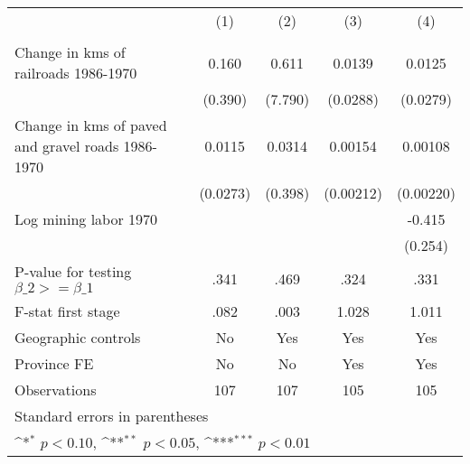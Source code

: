 {
\def\sym#1{\ifmmode^{#1}\else\(^{#1}\)\fi}
\begin{tabular}{l*{4}{c}}
\hline\hline
                &\multicolumn{1}{c}{(1)}&\multicolumn{1}{c}{(2)}&\multicolumn{1}{c}{(3)}&\multicolumn{1}{c}{(4)}\\
                &\multicolumn{1}{c}{}&\multicolumn{1}{c}{}&\multicolumn{1}{c}{}&\multicolumn{1}{c}{}\\
\hline
Change in kms of railroads 1986-1970&    0.160         &    0.611         &   0.0139         &   0.0125         \\
                &  (0.390)         &  (7.790)         & (0.0288)         & (0.0279)         \\
[1em]
Change in kms of paved and gravel roads 1986-1970&   0.0115         &   0.0314         &  0.00154         &  0.00108         \\
                & (0.0273)         &  (0.398)         &(0.00212)         &(0.00220)         \\
[1em]
Log mining labor 1970&                  &                  &                  &   -0.415         \\
                &                  &                  &                  &  (0.254)         \\
\hline
P-value for testing $\beta\_{2} >= \beta\_{1}$&     .341         &     .469         &     .324         &     .331         \\
F-stat first stage&     .082         &     .003         &    1.028         &    1.011         \\
Geographic controls&       No         &      Yes         &      Yes         &      Yes         \\
Province FE     &       No         &       No         &      Yes         &      Yes         \\
Observations    &      107         &      107         &      105         &      105         \\
\hline\hline
\multicolumn{5}{l}{\footnotesize Standard errors in parentheses}\\
\multicolumn{5}{l}{\footnotesize \sym{*} \(p<0.10\), \sym{**} \(p<0.05\), \sym{***} \(p<0.01\)}\\
\end{tabular}
}
